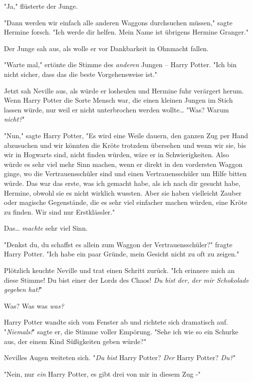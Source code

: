 {"Ja," flüsterte der Junge.

"Dann werden wir einfach alle anderen Waggons durchsuchen müssen," sagte Hermine forsch. "Ich werde dir helfen. Mein Name ist übrigens Hermine Granger."

Der Junge sah aus, als wolle er vor Dankbarkeit in Ohnmacht fallen.

"Warte mal," ertönte die Stimme des \emph{anderen} Jungen -- Harry Potter. "Ich bin nicht sicher, dass das die beste Vorgehensweise ist."

Jetzt sah Neville aus, als würde er losheulen und Hermine fuhr verärgert herum. Wenn Harry Potter die Sorte Mensch war, die einen kleinen Jungen im Stich lassen würde, nur weil er nicht unterbrochen werden wollte… "Was? Warum \emph{nicht?}"

"Nun," sagte Harry Potter, "Es wird eine Weile dauern, den ganzen Zug per Hand abzusuchen und wir könnten die Kröte trotzdem übersehen und wenn wir sie, bis wir in Hogwarts sind, nicht finden würden, wäre er in Schwierigkeiten. Also würde es sehr viel mehr Sinn machen, wenn er direkt in den vordersten Waggon ginge, wo die Vertrauensschüler sind und einen Vertrauensschüler um Hilfe bitten würde. Das war das erste, was ich gemacht habe, als ich nach dir gesucht habe, Hermine, obwohl sie es nicht wirklich wussten. Aber sie haben vielleicht Zauber oder magische Gegenstände, die es sehr viel einfacher machen würden, eine Kröte zu finden. Wir sind nur Erstklässler."

Das… \emph{machte} sehr viel Sinn.

"Denkst du, du schaffst es allein zum Waggon der Vertrauensschüler?" fragte Harry Potter. "Ich habe ein paar Gründe, mein Gesicht nicht zu oft zu zeigen."

Plötzlich keuchte Neville und trat einen Schritt zurück. "Ich erinnere mich an diese Stimme! Du bist einer der Lords des Chaos! \emph{Du bist der, der mir Schokolade gegeben hat!}"

Was? Was was \emph{was?}

Harry Potter wandte sich vom Fenster ab und richtete sich dramatisch auf. "\emph{Niemals!}" sagte er, die Stimme voller Empörung. "Sehe ich wie so ein Schurke aus, der einem Kind Süßigkeiten geben würde?"

Nevilles Augen weiteten sich. "\emph{Du bist} Harry Potter? \emph{Der} Harry Potter? \emph{Du?}"

"Nein, nur \emph{ein} Harry Potter, es gibt drei von mir in diesem Zug -"

}

